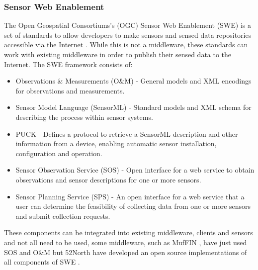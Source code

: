 	\subsubsection{Sensor Web Enablement}
		The Open Geospatial Consortiums's (OGC) Sensor Web Enablement (SWE) is a set of standards to allow developers to make sensors and sensed data repositories accessible via the Internet \cite{botts}. While this is not a middleware, these standards can work with existing middleware in order to publish their sensed data to the Internet. The SWE framework consists of:

		\begin{itemize}
			\item Observations \& Measurements (O\&M) - General models and XML encodings for observations and measurements.
			\item Sensor Model Language (SensorML) - Standard models and XML schema for describing the process within sensor systems.
			\item PUCK - Defines a protocol to retrieve a SensorML description and other information from a device, enabling automatic sensor installation, configuration and operation.
			\item Sensor Observation Service (SOS) - Open interface for a web service to obtain observations and sensor descriptions for one or more sensors.
			\item Sensor Planning Service (SPS) - An open interface for a web service that a user can determine the feasibility of collecting data from one or more sensors and submit collection requests.
		\end{itemize}

		These components can be integrated into existing middleware, clients and sensors and not all need to be used, some middleware, such as MufFIN \cite{Valente2011}, have just used SOS and O\&M but 52North have developed an open source implementations of all components of SWE \cite{broring2011new}.


